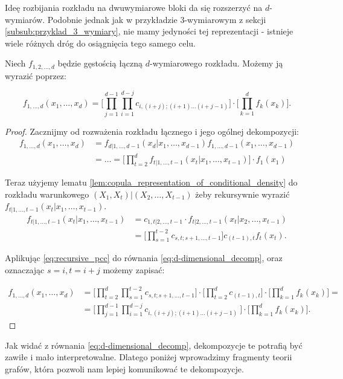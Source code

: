 Ideę rozbijania rozkładu na dwuwymiarowe bloki da się rozszerzyć na $d$-wymiarów. Podobnie jednak jak w przykładzie 3-wymiarowym z sekcji \ref{subsub:przyklad_3_wymiary}, nie mamy jedyności tej reprezentacji - istnieje wiele różnych dróg do osiągnięcia tego samego celu. 

\begin{thm}
	Niech $f_{1,2,\dots,d}$ będzie gęstością łączną $d$-wymiarowego rozkładu. Możemy ją wyrazić poprzez:
	
	\begin{equation}
		f_{1,\dots, d}(x_1, \dots, x_d) = \bigg[ \prod_{j=1}^{d-1} \prod_{i=1}^{d-j} c_{i, (i+j); (i+1)\dots(i+j-1)} \bigg] \cdot \bigg[ \prod_{k=1}^{d}f_k(x_k)\bigg].
	\end{equation}
\end{thm}
\begin{proof}
	Zacznijmy od rozważenia rozkładu łącznego i jego ogólnej dekompozycji:
\begin{equation}
	\begin{split}
		f_{1, \dots, d}(x_1, \dots, x_d) &= f_{d|1 , \dots, d-1}(x_d|x_1, \dots, x_{d-1})f_{1,\dots,d-1}(x_1, \dots, x_{d-1})\\
		&=\dots= \bigg[\prod_{t=2}^{d}f_{t|1,\dots,t-1}(x_t|x_1, \dots, x_{t-1})\bigg]\cdot f_1(x_1)
	\end{split}
	\label{eq:d-dimensional_decomp}
\end{equation}

Teraz użyjemy lematu \ref{lem:copula_representation_of_conditional_density} do rozkładu warunkowego $(X_1, X_t) | (X_2, \dots, X_{t-1})$ żeby rekursywnie wyrazić $f_{t|1,\dots,t-1}(x_t|x_1,\dots,x_{t-1})$.
	\begin{equation}
	\begin{split}
	f_{t|1,\dots,t-1}(x_t|x_1,\dots,x_{t-1})&= c_{1,t|2,\dots,t-1}\cdot f_{t|2,\dots,t-1}(x_t|x_2,\dots,x_{t-1})  \\
	& = \bigg[ \prod_{s=1}^{t-2} c_{s,t;s+1,\dots,t-1} \bigg] c_{(t-1), t} f_t(x_t).	
	\end{split}
	\label{eq:recursive_pcc}
	\end{equation}

Aplikując \ref{eq:recursive_pcc} do równania \ref{eq:d-dimensional_decomp}, oraz oznaczając $s=i, t=i+j$ możemy zapisać:

\begin{equation*}
	\begin{split}
		f_{1, \dots, d}(x_1, \dots, x_d) &= \bigg[\prod_{t=2}^{d}\prod_{s=1}^{t-2} c_{s,t;s+1,\dots,t-1}\bigg] \cdot \bigg[ \prod_{t=2}^{d}c_{(t-1), t} \bigg] \cdot \bigg[ \prod_{k=1}^{d}f_{k}(x_k) \bigg] = \\
		& = \bigg[\prod_{j=1}^{d-1}\prod_{i=1}^{d-j}c_{i,(i+j);(i+1)\dots(i+j-1)}\ \bigg] \cdot \bigg[\prod_{k=1}^{d}f_k(x_k)\bigg].
	\end{split}
\end{equation*}
\end{proof}

Jak widać z równania \ref{eq:d-dimensional_decomp}, dekompozycje te potrafią być zawiłe i mało interpretowalne. Dlatego poniżej wprowadzimy fragmenty teorii grafów, która pozwoli nam lepiej komunikować te dekompozycje.